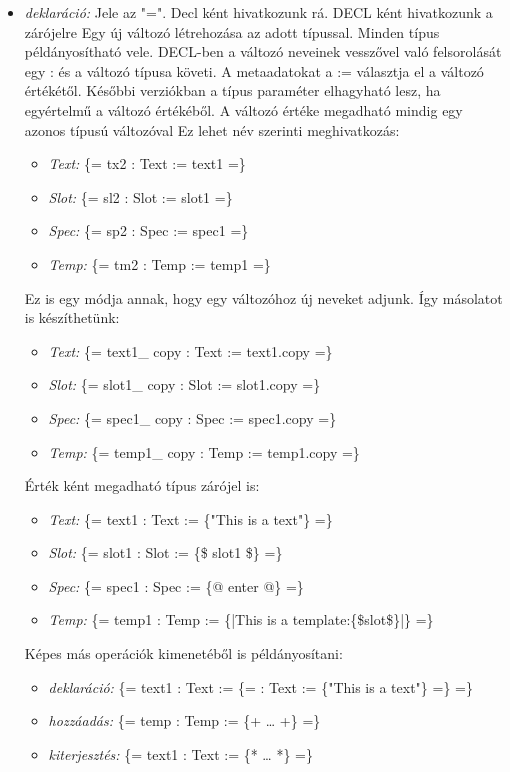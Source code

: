 \begin{itemize}
\item \emph{deklaráció:} 
Jele az "=".
Decl ként hivatkozunk rá.
DECL ként hivatkozunk a zárójelre
Egy új változó létrehozása az adott típussal.
Minden típus példányosítható vele.
DECL-ben a változó neveinek vesszővel való felsorolását egy : és a változó típusa követi. 
A metaadatokat a := választja el a változó értékétől.
Későbbi verziókban a típus paraméter elhagyható lesz, ha egyértelmű a változó értékéből. 
A változó értéke megadható mindig egy azonos típusú változóval
Ez lehet név szerinti meghivatkozás:
\begin{itemize}
\item\emph{Text:} \{= tx2 : Text := text1 =\}
\item\emph{Slot:} \{= sl2 : Slot := slot1 =\}
\item\emph{Spec:} \{= sp2 : Spec := spec1 =\}
\item\emph{Temp:} \{= tm2 : Temp := temp1 =\}
\end{itemize}
Ez is egy módja annak, hogy egy változóhoz új neveket adjunk.
Így másolatot is készíthetünk:
\begin{itemize}
\item\emph{Text:} \{= text1\_ copy : Text := text1.copy =\}
\item\emph{Slot:} \{= slot1\_ copy : Slot := slot1.copy =\}
\item\emph{Spec:} \{= spec1\_ copy : Spec := spec1.copy =\}
\item\emph{Temp:} \{= temp1\_ copy : Temp := temp1.copy =\}
\end{itemize}
Érték ként megadható típus zárójel is:
\begin{itemize}
\item\emph{Text:} \{= text1 : Text := \{"This is a text"\} =\}
\item\emph{Slot:} \{= slot1 : Slot := \{\$ slot1 \$\} =\}
\item\emph{Spec:} \{= spec1 : Spec := \{@ enter @\} =\}
\item\emph{Temp:} \{= temp1 : Temp := \{|This is a template:\{\$slot\$\}|\} =\}
\end{itemize}
Képes más operációk kimenetéből is példányosítani:
\begin{itemize}
\item\emph{deklaráció:} \{= text1 : Text := \{= : Text := \{"This is a text"\} =\} =\}
\item\emph{hozzáadás:} \{= temp : Temp := \{+ … +\} =\}
\item\emph{kiterjesztés:} \{= text1 : Text := \{* … *\} =\}

\end{itemize}
\end{itemize}
